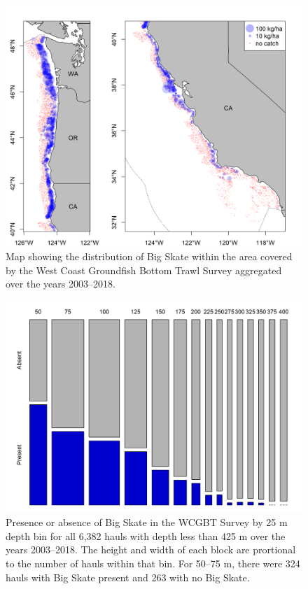 \documentclass[12pt,]{article}
\begin{document}
\begin{figure}[!h]
\begin{centering}
\vspace{2.5cm}
\includegraphics{Figures/survey_hauls_map.png}
\caption{Map showing the distribution of Big Skate within the area covered by the West Coast Groundfish Bottom Trawl Survey aggregated over the years 2003--2018.}\label{fig:survey_hauls_map}
\end{centering}
\end{figure}

\newpage

\FloatBarrier

\begin{figure}
\centering
\includegraphics{Figures/WCGBTS_presence_absence_by_depth_bin.png}
\caption{Presence or absence of Big Skate in the WCGBT Survey by 25 m
depth bin for all 6,382 hauls with depth less than 425 m over the years
2003--2018. The height and width of each block are prortional to the
number of hauls within that bin. For 50--75 m, there were 324 hauls with
Big Skate present and 263 with no Big
Skate.\label{fig:WCGBTS_presence_absence_by_depth_bin}}
\end{figure}
\end{document}
